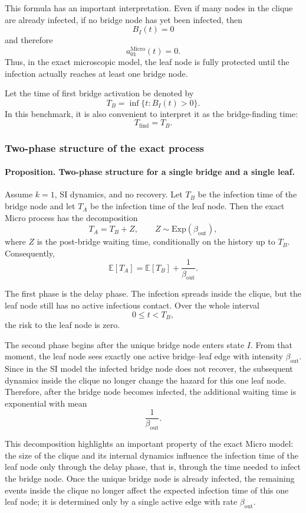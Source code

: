 \documentclass[a4paper,fleqn]{cas-sc}
\newcommand{\ReadStatusTwo}[5]{}
\begin{document}
This formula has an important interpretation. Even if many nodes in the clique are already infected, if no bridge node has yet been infected, then
\[
B_I(t)=0
\]
and therefore
\[
a_{01}^{\mathrm{Micro}}(t)=0.
\]
Thus, in the exact microscopic model, the leaf node is fully protected until the infection actually reaches at least one bridge node.

Let the time of first bridge activation be denoted by
\[
T_B=\inf\{t:B_I(t)>0\}.
\]
In this benchmark, it is also convenient to interpret it as the bridge-finding time:
\[
T_{\mathrm{find}}=T_B.
\]

\subsubsection{Two-phase structure of the exact process}
\ReadStatusTwo{Two-phase structure of the exact process}{Yulian}{1}{Michael}{0}

\paragraph{Proposition. Two-phase structure for a single bridge and a single leaf.}
Assume \(k=1\), SI dynamics, and no recovery. Let \(T_B\) be the infection time of the bridge node and let \(T_A\) be the infection time of the leaf node. Then the exact Micro process has the decomposition
\[
T_A=T_B+Z,
\qquad
Z\sim \mathrm{Exp}(\beta_{\mathrm{out}}),
\]
where \(Z\) is the post-bridge waiting time, conditionally on the history up to \(T_B\). Consequently,
\[
\mathbb{E}[T_A]
=
\mathbb{E}[T_B]
+
\frac{1}{\beta_{\mathrm{out}}}.
\]

The first phase is the delay phase. The infection spreads inside the clique, but the leaf node still has no active infectious contact. Over the whole interval
\[
0\leq t<T_B,
\]
the risk to the leaf node is zero.

The second phase begins after the unique bridge node enters state \(I\). From that moment, the leaf node sees exactly one active bridge--leaf edge with intensity \(\beta_{\mathrm{out}}\). Since in the SI model the infected bridge node does not recover, the subsequent dynamics inside the clique no longer change the hazard for this one leaf node. Therefore, after the bridge node becomes infected, the additional waiting time is exponential with mean
\[
\frac{1}{\beta_{\mathrm{out}}}.
\]

This decomposition highlights an important property of the exact Micro model: the size of the clique and its internal dynamics influence the infection time of the leaf node only through the delay phase, that is, through the time needed to infect the bridge node. Once the unique bridge node is already infected, the remaining events inside the clique no longer affect the expected infection time of this one leaf node; it is determined only by a single active edge with rate \(\beta_{\mathrm{out}}\).
\end{document}
